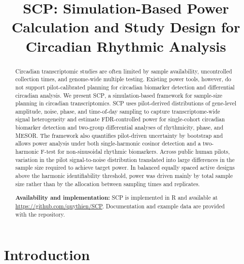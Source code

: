 \documentclass{article}
\title{\textsc{SCP}: Simulation-Based Power Calculation and Study Design for Circadian Rhythmic Analysis}
\author{}
\date{}
\begin{document}
\maketitle

\begin{abstract}
Circadian transcriptomic studies are often limited by sample availability,
uncontrolled collection times, and genome-wide multiple testing. Existing power
tools, however, do not support pilot-calibrated planning for circadian biomarker
detection and differential circadian analysis. We present \textsc{SCP}, a
simulation-based framework for sample-size planning in circadian transcriptomics.
\textsc{SCP} uses pilot-derived distributions of gene-level amplitude, noise,
phase, and time-of-day sampling to capture transcriptome-wide signal
heterogeneity and estimate FDR-controlled power for single-cohort circadian
biomarker detection and two-group differential analyses of rhythmicity, phase,
and MESOR. The framework also quantifies pilot-driven uncertainty by bootstrap
and allows power analysis under both single-harmonic cosinor detection and a
two-harmonic F-test for non-sinusoidal rhythmic biomarkers. Across public human
pilots, variation in the pilot signal-to-noise distribution translated into
large differences in the sample size required to achieve target power. In
balanced equally spaced active designs above the harmonic identifiability
threshold, power was driven mainly by total sample size rather than by the
allocation between sampling times and replicates.

\textbf{Availability and implementation:} \textsc{SCP} is implemented in R and
available at \url{https://github.com/quythien/SCP}. Documentation and example
data are provided with the repository.
\end{abstract}
\section{Introduction}
\end{document}
